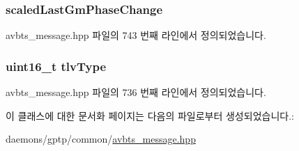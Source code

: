 \subsubsection[{\texorpdfstring{scaled\+Last\+Gm\+Phase\+Change}{scaledLastGmPhaseChange}}]{ scaled\+Last\+Gm\+Phase\+Change\hspace{0.3cm}{\ttfamily [private]}}\hypertarget{class_follow_up_t_l_v_a45a0857a47dc527dd3b7975551f69333}{}\label{class_follow_up_t_l_v_a45a0857a47dc527dd3b7975551f69333}


avbts\+\_\+message.\+hpp 파일의 743 번째 라인에서 정의되었습니다.

\subsubsection[{\texorpdfstring{tlv\+Type}{tlvType}}]{\setlength{\rightskip}{0pt plus 5cm}uint16\+\_\+t tlv\+Type\hspace{0.3cm}{\ttfamily [private]}}\hypertarget{class_follow_up_t_l_v_a90baf0e86e13da82746e3aab1436388b}{}\label{class_follow_up_t_l_v_a90baf0e86e13da82746e3aab1436388b}


avbts\+\_\+message.\+hpp 파일의 736 번째 라인에서 정의되었습니다.



이 클래스에 대한 문서화 페이지는 다음의 파일로부터 생성되었습니다.\+:\begin{DoxyCompactItemize}
\item 
daemons/gptp/common/\hyperlink{avbts__message_8hpp}{avbts\+\_\+message.\+hpp}\end{DoxyCompactItemize}
